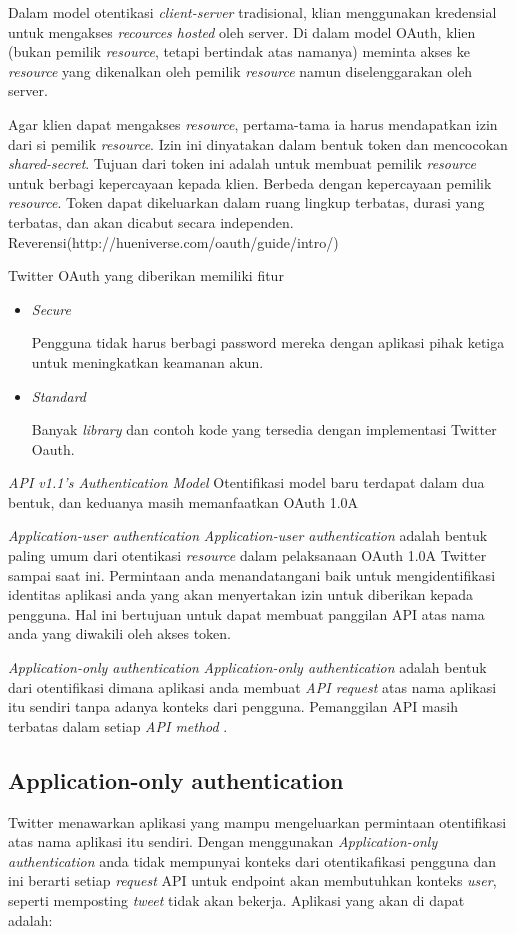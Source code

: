 Dalam model otentikasi \textit{client-server} tradisional, klian menggunakan kredensial untuk mengakses \textit{recources hosted} oleh server. Di dalam model OAuth, klien (bukan pemilik \textit{resource}, tetapi bertindak atas namanya) meminta akses ke \textit{resource} yang dikenalkan oleh pemilik \textit{resource} namun diselenggarakan oleh server.

Agar klien dapat mengakses \textit{resource}, pertama-tama ia harus mendapatkan izin dari si pemilik \textit{resource}. Izin ini dinyatakan dalam bentuk token dan mencocokan \textit{shared-secret}. Tujuan dari token ini adalah untuk membuat pemilik \textit{resource} untuk berbagi kepercayaan kepada klien. Berbeda dengan kepercayaan pemilik \textit{resource}. Token dapat dikeluarkan dalam ruang lingkup terbatas, durasi yang terbatas, dan akan dicabut secara independen. Reverensi(http://hueniverse.com/oauth/guide/intro/)

Twitter OAuth yang diberikan memiliki fitur
\begin{itemize}
	\item \textit{Secure}
	
	Pengguna tidak harus berbagi password mereka dengan aplikasi pihak ketiga untuk meningkatkan keamanan akun.
	\item \textit{Standard}
	
	Banyak \textit{library} dan contoh kode yang tersedia dengan implementasi Twitter Oauth.
\end{itemize}

\textit{API v1.1's Authentication Model}
Otentifikasi model baru terdapat dalam dua bentuk, dan keduanya masih memanfaatkan OAuth 1.0A


\textit{Application-user authentication}
\textit{Application-user authentication} adalah bentuk paling umum dari otentikasi \textit{resource} dalam pelaksanaan OAuth 1.0A Twitter sampai saat ini. Permintaan anda menandatangani baik untuk mengidentifikasi identitas aplikasi anda yang akan menyertakan izin untuk diberikan kepada pengguna. Hal ini bertujuan untuk dapat membuat panggilan API atas nama anda yang diwakili oleh akses token.

\textit{Application-only authentication}
\textit{Application-only authentication} adalah bentuk dari otentifikasi dimana aplikasi anda membuat \textit{API request} atas nama aplikasi itu sendiri tanpa adanya konteks dari pengguna. Pemanggilan API masih terbatas dalam setiap \textit{API method} .


\subsection{Application-only authentication}
Twitter menawarkan aplikasi yang mampu mengeluarkan permintaan otentifikasi atas nama aplikasi itu sendiri. Dengan menggunakan \textit{Application-only authentication} anda tidak mempunyai konteks dari otentikafikasi pengguna dan ini berarti setiap \textit{request} API untuk endpoint akan membutuhkan konteks \textit{user}, seperti memposting \textit{tweet} tidak akan bekerja. Aplikasi yang akan di dapat adalah: 

